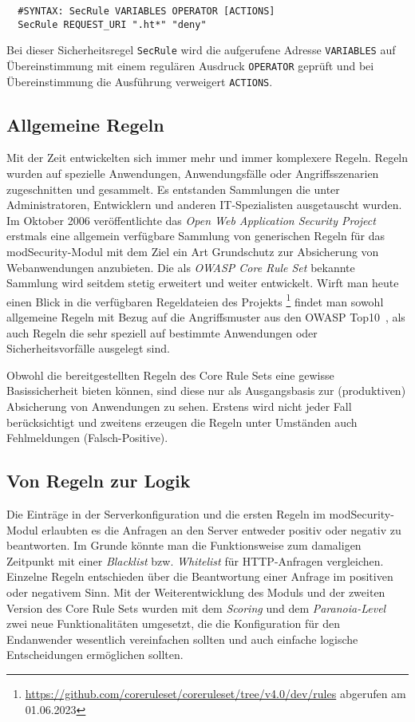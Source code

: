 \begin{lstlisting}
  #SYNTAX: SecRule VARIABLES OPERATOR [ACTIONS]        
  SecRule REQUEST_URI ".ht*" "deny"
\end{lstlisting}

Bei dieser Sicherheitsregel \verb=SecRule= wird die aufgerufene Adresse \verb=VARIABLES= auf Übereinstimmung mit einem regulären Ausdruck \verb=OPERATOR= geprüft und bei Übereinstimmung die Ausführung verweigert \verb=ACTIONS=.

\subsection{Allgemeine Regeln}
Mit der Zeit entwickelten sich immer mehr und immer komplexere Regeln. Regeln wurden auf spezielle Anwendungen, Anwendungsfälle oder Angriffsszenarien zugeschnitten und gesammelt. Es entstanden Sammlungen die unter Administratoren, Entwicklern und anderen IT-Spezialisten ausgetauscht wurden.
Im Oktober 2006 veröffentlichte das \emph{Open Web Application Security Project} erstmals eine allgemein verfügbare Sammlung von generischen Regeln für das modSecurity-Modul mit dem Ziel ein Art Grundschutz zur Absicherung von Webanwendungen anzubieten. Die als \emph{OWASP Core Rule Set} bekannte Sammlung wird seitdem stetig erweitert und weiter entwickelt. Wirft man heute einen Blick in die verfügbaren Regeldateien des Projekts \footnote{\url{https://github.com/coreruleset/coreruleset/tree/v4.0/dev/rules} abgerufen am 01.06.2023} findet man sowohl allgemeine Regeln mit Bezug auf die Angriffsmuster aus den OWASP Top10~\cite{owasp10}, als auch Regeln die sehr speziell auf bestimmte Anwendungen oder Sicherheitsvorfälle ausgelegt sind.

Obwohl die bereitgestellten Regeln des Core Rule Sets eine gewisse Basissicherheit bieten können, sind diese nur als Ausgangsbasis zur (produktiven) Absicherung von Anwendungen zu sehen. Erstens wird nicht jeder Fall berücksichtigt und zweitens erzeugen die Regeln unter Umständen auch Fehlmeldungen (Falsch-Positive).

\subsection{Von Regeln zur Logik}
\label{sec:rullog}
Die Einträge in der Serverkonfiguration und die ersten Regeln im modSecurity-Modul erlaubten es die Anfragen an den Server entweder positiv oder negativ zu beantworten. Im Grunde könnte man die Funktionsweise zum damaligen Zeitpunkt mit einer \emph{Blacklist} bzw. \emph{Whitelist} für HTTP-Anfragen vergleichen. Einzelne Regeln entschieden über die Beantwortung einer Anfrage im positiven oder negativem Sinn. Mit der Weiterentwicklung des Moduls und der zweiten Version des Core Rule Sets wurden mit dem \emph{Scoring} und dem \emph{Paranoia-Level} zwei neue Funktionalitäten umgesetzt, die die Konfiguration für den Endanwender wesentlich vereinfachen sollten und auch einfache logische Entscheidungen ermöglichen sollten.\\


